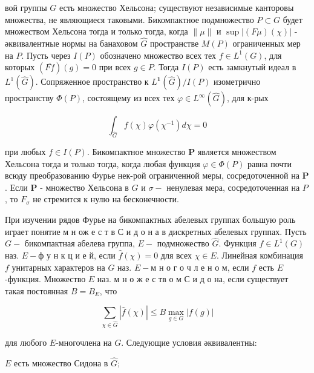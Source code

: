 \documentclass[10pt]{article}
\begin{document}
вой группы $G$ есть множество Хельсона; существуют независимые канторовы множества, не являющиеся таковыми. Бикомпактное подмножество $P \subset G$ будет множеством Хельсона тогда и только тогда, когда $\|\mu\|$ и $\sup |(F \mu)(\chi)|$ - әквивалентные нормы на банаховом $\widehat{G}$ пространстве $M(P)$ ограниченных мер на $P$. Пусть через $I(P)$ обозначено множество всех тех $f \in L^{1}(G)$, для которых $(\overline{F f})(g)=0$ при всех $g \in P$. Тогда $I(P)$ есть замкнутый идеал в $L^{1}(\widehat{G})$. Сопряженное пространство к $L^{\mathbf{1}}(\widehat{G}) / I(P)$ изометрично пространству $\Phi(P)$, состоящему из всех тех $\varphi \in L^{\infty}(\widehat{G})$, для к-рых



\[

\int_{\widehat{G}} f(\chi) \varphi\left(\chi^{-1}\right) d \chi=0

\]



при любых $f \in I(P)$. Бикомпактное множество $\boldsymbol{P}$ является множеством Хельсона тогда и только тогда, когда любая функция $\varphi \in \Phi(P)$ равна почти всюду преобразованию Фурье нек-рой ограниченной меры, сосредоточенной на $\boldsymbol{P}$. Если $\boldsymbol{P}$ - множество Хельсона в $G$ и $\sigma-$ ненулевая мера, сосредоточенная на $P$, то $F_{\sigma}$ не стремится к нулю на бесконечности.



При изучении рядов Фурье на бикомпактных абелевых группах большую роль играет понятие м н ож е с т в С и д о н а в дискретных абелевых группах. Пусть $G-$ бикомпактная абелева группа, $E-$ подмножество $\hat{G}$. Функция $f \in L^{1}(G)$ наз. $E-ф$ у н к ц и е й, если $\hat{f}(\chi)=0$ для всех $\chi \in E$. Линейная комбинация $f$ унитарных характеров на $G$ наз. $E-м$ н о г о ч л е н о м, если $f$ есть $E$-функция. Множество $E$ наз. м н о ж е с тв о м С и д о на, если существует такая постоянная $B=B_{E}$, что



\[

\sum_{\chi \in \widehat{G}}|\hat{f}(\chi)| \leqslant B \max _{g \in G}|f(g)|

\]



для любого $E$-многочлена на $G$. Следующие условия әквивалентны:



$E$ есть множество Сидона в $\hat{G}$;
\end{document}
